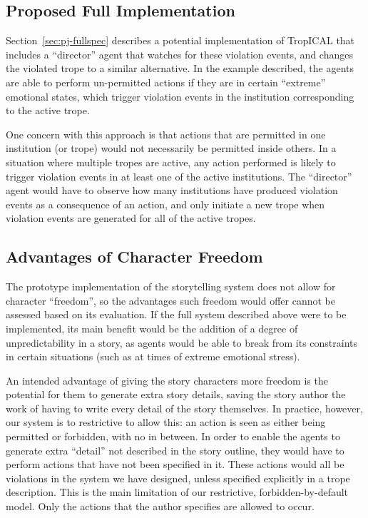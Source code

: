 \documentclass[11pt]{report}
\begin{document}
\subsection{Proposed Full Implementation}
Section~\ref{sec:pj-fullspec} describes a potential implementation of TropICAL
that includes a ``director'' agent that watches for these violation events, and
changes the violated trope to a similar alternative. In the example described,
the agents are able to perform un-permitted actions if they are in certain
``extreme'' emotional states, which trigger violation events in the institution
corresponding to the active trope.

One concern with this approach is that actions that are permitted in one
institution (or trope) would not necessarily be permitted inside others. In a
situation where multiple tropes are active, any action performed is likely to
trigger violation events in at least one of the active institutions. The
``director'' agent would have to observe how many institutions have produced
violation events as a consequence of an action, and only initiate a new trope
when violation events are generated for all of the active tropes.

\subsection{Advantages of Character Freedom}
The prototype implementation of the storytelling system does not allow for
character ``freedom'', so the advantages such freedom would offer cannot be
assessed based on its evaluation. If the full system described above were to be
implemented, its main benefit would be the addition of a degree of
unpredictability in a story, as agents would be able to break from its
constraints in certain situations (such as at times of extreme emotional
stress).

An intended advantage of giving the story characters more freedom is the potential
for them to generate extra story details, saving the story author the work of
having to write every detail of the story themselves. In practice, however, our
system is to restrictive to allow this: an action is seen as either being
permitted or forbidden, with no in between. In order to enable the agents to
generate extra ``detail'' not described in the story outline, they would have to
perform actions that have not been specified in it. These actions would all be
violations in the system we have designed, unless specified explicitly in a
trope description. This is the main limitation of our restrictive,
forbidden-by-default model. Only the actions that the author specifies are
allowed to occur.
\end{document}
